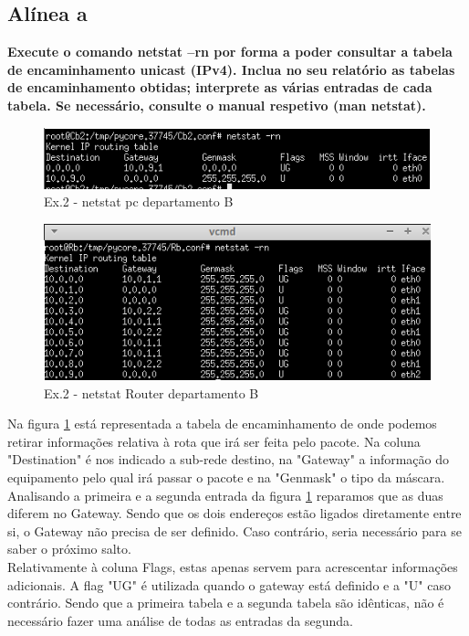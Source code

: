 \documentclass[a4paper]{report}
\begin{document}
\subsection{Alínea a}
\textbf{Execute o comando netstat –rn por forma a poder consultar a tabela de
encaminhamento unicast (IPv4). Inclua no seu relatório as tabelas de
encaminhamento obtidas; interprete as várias entradas de cada tabela. Se
necessário, consulte o manual respetivo (man netstat).}

\begin{figure}[H]
    \centering 
    \includegraphics[width=\textwidth]{images/netstatPcEx2P2.png}
    \caption{Ex.2 - netstat pc departamento B}
    \label{fig:netstatPcEx2P2}
\end{figure}

\begin{figure}[H]
    \centering 
    \includegraphics[width=\textwidth]{images/netstatRouterEx2P2.png}
    \caption{Ex.2 - netstat Router departamento B}
    \label{fig:netstatRouterEx2P2}
\end{figure}
Na figura \ref{fig:netstatPcEx2P2} está representada a tabela de encaminhamento
de onde podemos retirar informações relativa à rota que irá ser feita pelo
pacote. Na coluna "Destination" é nos indicado a sub-rede destino, na "Gateway"
a informação do equipamento pelo qual irá passar o pacote e na "Genmask" o tipo
da máscara.\\
Analisando a primeira e a segunda entrada da figura \ref{fig:netstatPcEx2P2} 
reparamos que as duas diferem no Gateway. Sendo que os dois endereços estão
ligados diretamente entre si, o Gateway não precisa de ser definido. Caso
contrário, seria necessário para se saber o próximo salto.\\
Relativamente à coluna Flags, estas apenas servem para acrescentar informações
adicionais. A flag "UG" é utilizada quando o gateway está definido e a "U" caso
contrário. Sendo que a primeira tabela e a segunda tabela são idênticas, não é
necessário fazer uma análise de todas as entradas da segunda.
\end{document}
